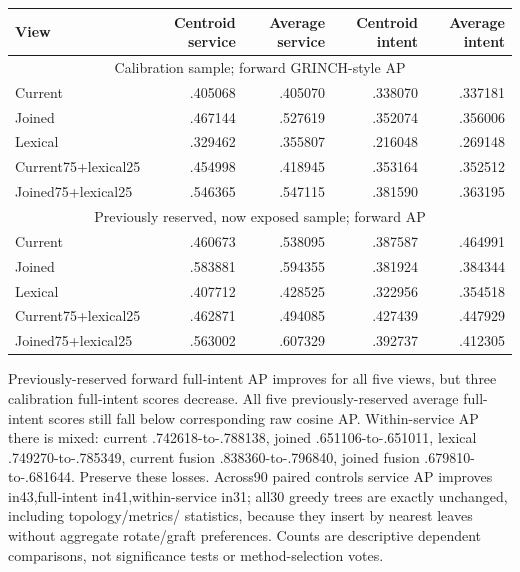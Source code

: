 \documentclass[11pt]{article}
\begin{document}
\begin{center}
\small
\begin{tabular}{lrrrr}
\toprule
View & Centroid service & Average service & Centroid intent & Average intent \\
\midrule
\multicolumn{5}{c}{Calibration sample; forward GRINCH-style AP} \\
Current & .405068 & .405070 & .338070 & .337181 \\
Joined & .467144 & .527619 & .352074 & .356006 \\
Lexical & .329462 & .355807 & .216048 & .269148 \\
Current75+lexical25 & .454998 & .418945 & .353164 & .352512 \\
Joined75+lexical25 & .546365 & .547115 & .381590 & .363195 \\
\midrule
\multicolumn{5}{c}{Previously reserved, now exposed sample; forward AP} \\
Current & .460673 & .538095 & .387587 & .464991 \\
Joined & .583881 & .594355 & .381924 & .384344 \\
Lexical & .407712 & .428525 & .322956 & .354518 \\
Current75+lexical25 & .462871 & .494085 & .427439 & .447929 \\
Joined75+lexical25 & .563002 & .607329 & .392737 & .412305 \\
\bottomrule
\end{tabular}
\end{center}
Previously-reserved forward full-intent AP improves for all five views, but
three calibration full-intent scores decrease. All five previously-reserved
average full-intent scores still fall below corresponding raw cosine AP.
Within-service AP there is mixed: current .742618-to-.788138, joined
.651106-to-.651011, lexical .749270-to-.785349, current fusion
.838360-to-.796840, joined fusion .679810-to-.681644. Preserve these losses.
Across90 paired controls service AP improves in43,full-intent in41,within-service
in31; all30 greedy trees are exactly unchanged, including topology/metrics/
statistics, because they insert by nearest leaves without aggregate rotate/graft
preferences. Counts are descriptive dependent comparisons, not significance
tests or method-selection votes.
\end{document}
